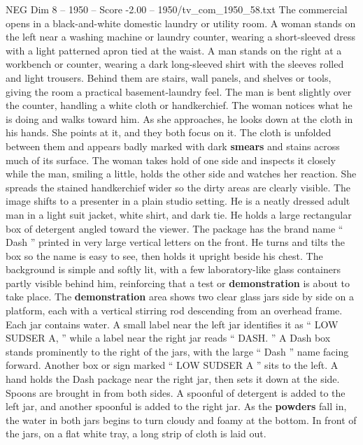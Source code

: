 \begin{textsample}{NEG Dim 8 – 1950 – Score -2.00 – 1950/tv\_com\_1950\_58.txt}  \label{ex:f8_neg_029}
The commercial opens in a black-and-white domestic laundry or utility room.
A woman stands on the left near a washing machine or laundry counter, wearing a short-sleeved dress with a light patterned apron tied at the waist.
A man stands on the right at a workbench or counter, wearing a dark long-sleeved shirt with the sleeves rolled and light trousers.
Behind them are stairs, wall panels, and shelves or tools, giving the room a practical basement-laundry feel.
The man is bent slightly over the counter, handling a white cloth or handkerchief.
The woman notices what he is doing and walks toward him.
As she approaches, he looks down at the cloth in his hands.
She points at it, and they both focus on it.
The cloth is unfolded between them and appears badly marked with dark \textbf{smears} and stains across much of its surface.
The woman takes hold of one side and inspects it closely while the man, smiling a little, holds the other side and watches her reaction.
She spreads the stained handkerchief wider so the dirty areas are clearly visible.
The image shifts to a presenter in a plain studio setting.
He is a neatly dressed adult man in a light suit jacket, white shirt, and dark tie.
He holds a large rectangular box of detergent angled toward the viewer.
The package has the brand name “ Dash ” printed in very large vertical letters on the front.
He turns and tilts the box so the name is easy to see, then holds it upright beside his chest.
The background is simple and softly lit, with a few laboratory-like glass containers partly visible behind him, reinforcing that a test or \textbf{demonstration} is about to take place.
The \textbf{demonstration} area shows two clear glass jars side by side on a platform, each with a vertical stirring rod descending from an overhead frame.
Each jar contains water.
A small label near the left jar identifies it as “ LOW SUDSER A, ” while a label near the right jar reads “ DASH. ” A Dash box stands prominently to the right of the jars, with the large “ Dash ” name facing forward.
Another box or sign marked “ LOW SUDSER A ” sits to the left.
A hand holds the Dash package near the right jar, then sets it down at the side.
Spoons are brought in from both sides.
A spoonful of detergent is added to the left jar, and another spoonful is added to the right jar.
As the \textbf{powders} fall in, the water in both jars begins to turn cloudy and foamy at the bottom.
In front of the jars, on a flat white tray, a long strip of cloth is laid out.

\end{textsample}
